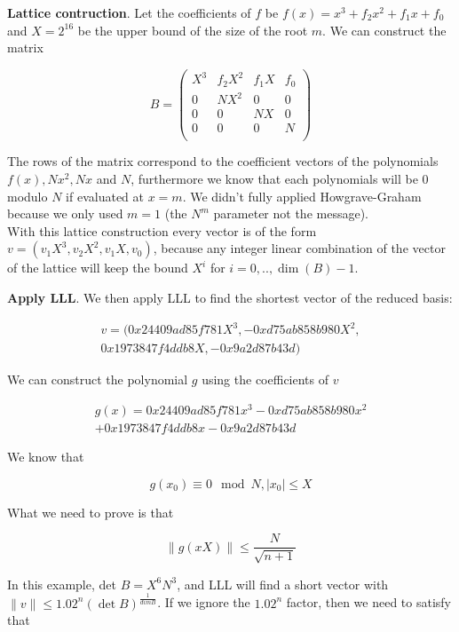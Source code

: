 \documentclass[a4paper,12pt]{report}
\begin{document}
\vspace*{10px}

\textbf{Lattice contruction}. Let the coefficients of $f$ be $f(x) = x^3 + f_2x^2 + f_1x + f_0$
and $X = 2^{16}$ be the upper bound of the size of the root $m$. We can construct the matrix

\[
B = 
\begin{pmatrix}
    X^3 & f_2X^2 & f_1X & f_0 \\
    0 & NX^2 & 0 & 0 \\
    0 & 0 & NX & 0 \\
    0 & 0 & 0 & N \\
\end{pmatrix}
\] 

The rows of the matrix correspond to the coefficient vectors of the polynomials $f(x), Nx^2, Nx$ and $N$, furthermore we know
that each polynomials will be 0 modulo $N$ if evaluated at $x = m$.
We didn't fully applied Howgrave-Graham because we only used $m=1$ (the $N^m$ parameter not the message).\\
With this lattice construction every vector is of the form $v = (v_1X^3, v_2X^2, v_1X, v_0)$, because any
integer linear combination of the vector of the lattice will keep the bound $X^i$ for $i=0,..,\dim(B)-1$.

\textbf{Apply LLL}. We then apply LLL to find the shortest vector of the reduced basis:

\[
    \begin{split}
    v = (0x24409ad85f781X^3, -0xd75ab858b980X^2, \\
        0x1973847f4ddb8X, -0x9a2d87b43d)
    \end{split}
\]

We can construct the polynomial $g$ using the coefficients of $v$

\[
    \begin{split}
        g(x) = 0x24409ad85f781x^3  - 0xd75ab858b980x^2 \\ 
        + 0x1973847f4ddb8x - 0x9a2d87b43d
    \end{split}
\]

We know that

\[
    g(x_0) \equiv 0 \mod N, |x_0| \le X
\]

What we need to prove is that

\[
    \lVert g(xX) \rVert \le \frac{N}{\sqrt{n+1}}
\] 

In this example, det $B = X^6N^3$, and LLL will find a short vector with $\lVert v \rVert \le 1.02^n (\det B)^{\frac{1}{dimB}}$.
If we ignore the $1.02^n$ factor, then we need to satisfy that
\end{document}
